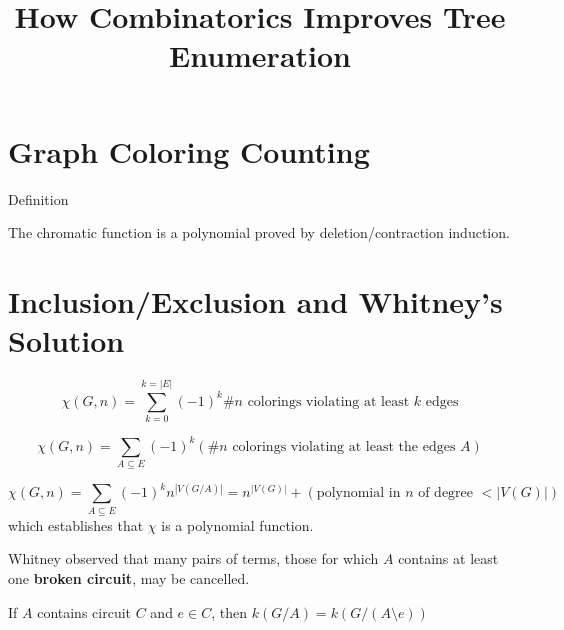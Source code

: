 \documentclass{article}
\title{How Combinatorics Improves Tree Enumeration}
\begin{document}
\maketitle

\section{Graph Coloring Counting}

Definition

The chromatic function is a polynomial proved by deletion/contraction
induction.

\section{Inclusion/Exclusion and Whitney's Solution}

\[
\chi(G,n) = \sum_{k=0}^{k=|E|}(-1)^k \text{\# }n\text{ colorings violating at least }
k\text{ edges}
\]

\[
\chi(G,n) = \sum_{A\subseteq E}(-1)^k 
(\text{\# }n\text{ colorings violating at least the edges }A)
\]

\[
\chi(G,n) = \sum_{A\subseteq E}(-1)^k 
n^{|V(G/A)|} = n^{|V(G)|} + (\text{polynomial in } n \text{ of degree } < |V(G)|)
\]
which establishes that $\chi$ is a polynomial function.  

Whitney observed that many pairs of terms, those for which $A$ contains at least 
one \textbf{broken circuit}, may be cancelled.

If $A$ contains circuit $C$ and $e\in C$, then $k(G/A) = k(G/(A\setminus e))$
\end{document}
